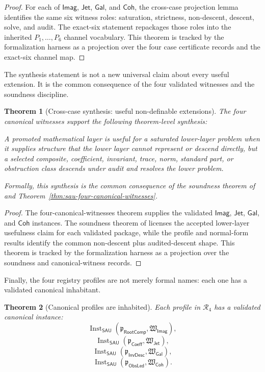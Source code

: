 \documentclass[11pt]{article}
\newcommand{\SAU}{\mathsf{SAU}}
\newcommand{\Inst}{\operatorname{Inst}}
\newcommand{\Imag}{\mathsf{Imag}}
\newcommand{\Jet}{\mathsf{Jet}}
\newcommand{\Galois}{\mathsf{Gal}}
\newcommand{\Coh}{\mathsf{Coh}}
\newcommand{\RootComp}{\mathsf{RootComp}}
\newcommand{\Coeff}{\mathsf{Coeff}}
\newcommand{\InvDesc}{\mathsf{InvDesc}}
\newcommand{\ObsLed}{\mathsf{ObsLed}}
\newtheorem{theorem}{Theorem}[section]
\theoremstyle{definition}
\begin{document}
\begin{proof}
For each of \(\Imag\), \(\Jet\), \(\Galois\), and \(\Coh\), the cross-case
projection lemma identifies the same six witness roles: saturation, strictness,
non-descent, descent, solve, and audit.  The exact-six statement repackages
those roles into the inherited \(P_1,\ldots,P_6\) channel vocabulary.  This
theorem is tracked by the formalization harness as a projection over the four
case certificate records and the exact-six channel map.
\end{proof}

The synthesis statement is not a new universal claim about every useful
extension.  It is the common consequence of the four validated witnesses and the
soundness discipline.

\begin{theorem}[Cross-case synthesis: useful non-definable extensions]
\label{thm:sau-cross-synthesis}
The four canonical witnesses support the following theorem-level synthesis:

\medskip
\noindent
\emph{A promoted mathematical layer is useful for a saturated lower-layer problem when it supplies structure that the lower layer cannot represent or descend directly, but a selected composite, coefficient, invariant, trace, norm, standard part, or obstruction class descends under audit and resolves the lower problem.}

\medskip
Formally, this synthesis is the common consequence of the soundness theorem of  and Theorem~\ref{thm:sau-four-canonical-witnesses}.
\end{theorem}

\begin{proof}
The four-canonical-witnesses theorem supplies the validated \(\Imag\), \(\Jet\),
\(\Galois\), and \(\Coh\) instances.  The soundness theorem of
 licenses the accepted lower-layer usefulness claim
for each validated package, while the profile and normal-form results identify
the common non-descent plus audited-descent shape.  This theorem is tracked by
the formalization harness as a projection over the soundness and canonical-witness
records.
\end{proof}

Finally, the four registry profiles are not merely formal names: each one has a
validated canonical inhabitant.

\begin{theorem}[Canonical profiles are inhabited]
\label{thm:sau-canonical-profiles-inhabited}
Each profile in \(\mathcal R_4\) has a validated canonical instance:
\[
\Inst_{\SAU}(\mathfrak p_{\RootComp},\mathfrak W_{\Imag}),
\]
\[
\Inst_{\SAU}(\mathfrak p_{\Coeff},\mathfrak W_{\Jet}),
\]
\[
\Inst_{\SAU}(\mathfrak p_{\InvDesc},\mathfrak W_{\Galois}),
\]
\[
\Inst_{\SAU}(\mathfrak p_{\ObsLed},\mathfrak W_{\Coh}).
\]
\end{theorem}
\end{document}
